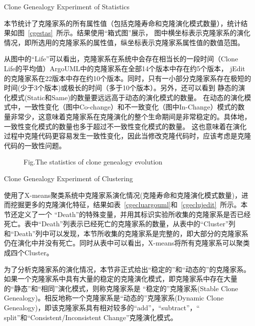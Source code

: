 {Clone Genealogy Experiment of Statistics} 

本节统计了克隆家系的所有属性值（包括克隆寿命和克隆演化模式数量），统计结果如图~\ref{cgestas}~所示。结果使用“箱式图”展示， 图中横坐标表示克隆家系的演化情况，即所选用的克隆家系的属性值，纵坐标表示克隆家系属性值的数值范围。
 
从图中的“Life”可以看出，克隆家系在系统中会存在相当长的一段时间（Clone Life的平均值）ArgoUML中的克隆家系在全部14个版本中存在约5个版本， jEdit的克隆家系在22版本中存在约10个版本。同时，只有一小部分克隆家系存在极短的时间(少于3个版本)或极长的时间（多于10个版本）。另外，还可以看到 静态的演化模式(Static和Same)的数量要远远高于动态的演化模式的数量。 在动态的演化模式中，一致性变化（图中Co-change）和不一致变化（图中In-Change）模式的数量非常少，这意味着克隆家系在克隆演化的整个生命期间是非常稳定的。具体地，一致性变化模式的数量也多于超过不一致性变化模式的数量。 这也意味着在演化过程中克隆代码更容易发生一致性变化，因此当修改克隆代码时，应该考虑是克隆代码的一致性问题。

\begin{figure}[htbp]
\centering
\subfigure{\label{cgestargo}}
\addtocounter{subfigure}{-2}
\subfigure{\label{cgestjedit}}
\addtocounter{subfigure}{-2}
{Fig.$\!$}{The statistics of clone genealogy evolution}
\vspace{-1em}
\end{figure}
 
{Clone Genealogy Experiment of Clustering} 

使用了X-means聚类系统中克隆家系演化情况(克隆寿命和克隆演化模式数量)，进而挖掘更多的克隆演化特征，结果如表~\ref{cgecluargouml}和~\ref{cgeclujedit}~所示。本节还定义了一个 “Death”的特殊变量，并用其标识实验所收集的克隆家系是否已经死亡。表中“Death”列表示已经死亡的克隆家系的数量，从表中的“Cluster”列和“Death”列中可以发现，本节所收集的克隆家系是完整的，即大部分的克隆家系仍在演化中并没有死亡。同时从表中可以看出，X-means将所有克隆家系可以聚类成四个Cluster。

为了分析克隆家系的演化情况，本节非正式给出“稳定的”和“动态的”的克隆家系。如果一个克隆家系中具有大量的稳定的克隆演化模式，即克隆家系中存在大量的“静态”和“相同”演化模式，则称克隆家系是 “稳定的”克隆家系(Stable Clone Genealogy)。相反地称一个克隆家系是“动态的”克隆家系(Dynamic Clone Genealogy)，即该克隆家系具有相对较多的“add”，“subtract”，“ split”和“Consistent/Inconsistent Change”克隆演化模式。

